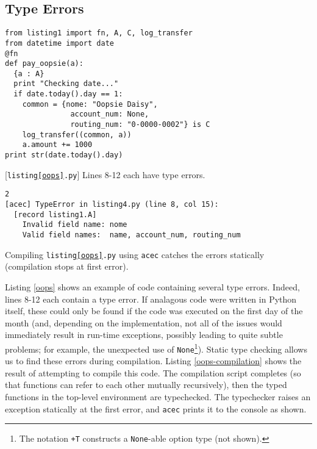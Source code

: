 {%

\subsection{Type Errors}
\begin{codelisting}[t]
\begin{lstlisting}
from listing1 import fn, A, C, log_transfer
from datetime import date
@fn
def pay_oopsie(a):
  {a : A}
  print "Checking date..."
  if date.today().day == 1:
    common = {nome: "Oopsie Daisy",
               account_num: None,
               routing_num: "0-0000-0002"} is C
    log_transfer((common, a))
    a.amount += 1000 
print str(date.today().day)
\end{lstlisting}
\caption{[\texttt{listing\ref{oops}.py}] Lines 8-12 each have type errors.}
\label{oops}
\end{codelisting}
\begin{codelisting}
\begin{lstlisting}[style=Bash]
% `acec listing4.py`
2
[acec] TypeError in listing4.py (line 8, col 15): 
  [record listing1.A] 
    Invalid field name: nome
    Valid field names:  name, account_num, routing_num
\end{lstlisting}
\caption{Compiling \texttt{listing\ref{oops}.py} using \texttt{acec} catches the errors statically (compilation stops at first error).}
\label{oops-compilation}
\end{codelisting}Listing \ref{oops} shows an example of code containing several type errors. Indeed, lines 8-12 each contain a type error. If analagous code were written in Python itself, these could only be found if the code was executed on the first day of the month (and, depending on the implementation, not all of the issues would  immediately result in run-time exceptions, possibly leading to quite subtle problems; for example, the unexpected use of \verb|None|\footnote{The notation \texttt{+T} constructs a \texttt{None}-able option type (not shown).}). Static type checking allows us to find these errors during compilation. Listing \ref{oops-compilation} shows the result of attempting to compile this code. The compilation script completes (so that functions can refer to each other mutually recursively), then the typed functions in the top-level environment are typechecked. The typechecker raises an exception statically at the first error, and \verb|acec| prints it to the console as shown.




}
